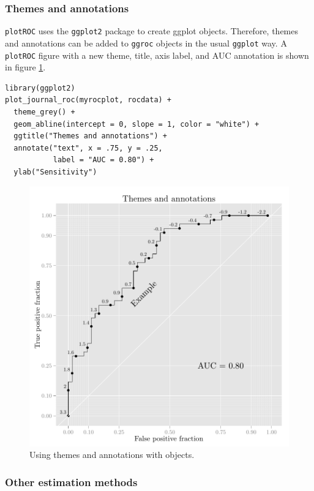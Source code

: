 \documentclass[article]{jss}
\begin{document}
\subsubsection{Themes and annotations}\label{themes-and-annotations}

\texttt{plotROC} uses the \texttt{ggplot2} package to create ggplot
objects. Therefore, themes and annotations can be added to
\texttt{ggroc} objects in the usual \texttt{ggplot} way. A
\texttt{plotROC} figure with a new theme, title, axis label, and AUC
annotation is shown in figure \ref{annotate}.

\begin{verbatim}
library(ggplot2)
plot_journal_roc(myrocplot, rocdata) + 
  theme_grey() + 
  geom_abline(intercept = 0, slope = 1, color = "white") + 
  ggtitle("Themes and annotations") + 
  annotate("text", x = .75, y = .25, 
           label = "AUC = 0.80") + 
  ylab("Sensitivity")
\end{verbatim}

\begin{figure}[htbp]
\centering
\includegraphics{figure/print2-1.pdf}
\caption{Using  themes and annotations with 
objects. \label{annotate}}
\end{figure}

\subsubsection{Other estimation methods}\label{other-estimation-methods}
\end{document}
